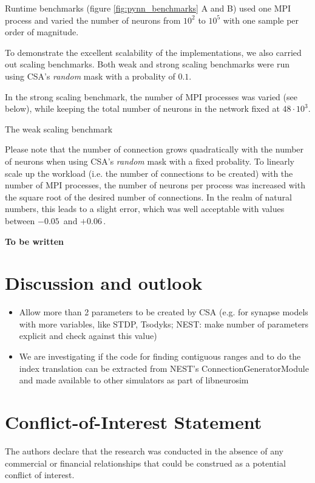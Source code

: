 \documentclass{frontiersSCNS} %
\newcommand{\permil}{\,\textperthousand\xspace}
\newcommand{\tbw}[1]{{\bf\parindent0pt\color{red}#1}}
\begin{document}
Runtime benchmarks (figure \ref{fig:pynn_benchmarks} A and B) used one
MPI process and varied the number of neurons from $10^2$ to $10^5$
with one sample per order of magnitude.

To demonstrate the excellent scalability of the implementations, we
also carried out scaling benchmarks. Both weak and strong scaling
benchmarks were run using CSA's \emph{random} mask with a probality of
$0.1$.

In the strong scaling benchmark, the number of MPI processes was
varied (see below), while keeping the total number of neurons in the
network fixed at $48 \cdot 10^3$.

The weak scaling benchmark

Please note that the number of connection grows quadratically with the
number of neurons when using CSA's \emph{random} mask with a fixed
probality. To linearly scale up the workload (i.e. the number of
connections to be created) with the number of MPI processes, the
number of neurons per process was increased with the square root of
the desired number of connections. In the realm of natural numbers,
this leads to a slight error, which was well acceptable with values
between $-0.05$\permil and $+0.06$\permil.

\tbw{To be written}


\section{Discussion and outlook}

\begin{itemize}
\item Allow more than 2 parameters to be created by CSA (e.g. for
  synapse models with more variables, like STDP, Tsodyks; NEST: make
  number of parameters explicit and check against this value)
\item We are investigating if the code for finding contiguous ranges
  and to do the index translation can be extracted from NEST's
  ConnectionGeneratorModule and made available to other simulators as
  part of libneurosim
\end{itemize}


\section*{Conflict-of-Interest Statement}
The authors declare that the research was conducted in the absence of
any commercial or financial relationships that could be construed as a
potential conflict of interest.
\end{document}
